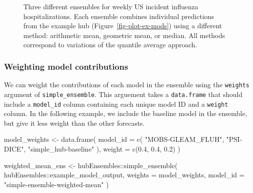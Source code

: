 \documentclass[
]{article}
\newenvironment{Shaded}{\begin{snugshade}}{\end{snugshade}}
\newcommand{\AttributeTok}[1]{\textcolor[rgb]{0.40,0.45,0.13}{#1}}
\newcommand{\FloatTok}[1]{\textcolor[rgb]{0.68,0.00,0.00}{#1}}
\newcommand{\FunctionTok}[1]{\textcolor[rgb]{0.28,0.35,0.67}{#1}}
\newcommand{\NormalTok}[1]{\textcolor[rgb]{0.00,0.23,0.31}{#1}}
\newcommand{\OtherTok}[1]{\textcolor[rgb]{0.00,0.23,0.31}{#1}}
\newcommand{\SpecialCharTok}[1]{\textcolor[rgb]{0.37,0.37,0.37}{#1}}
\newcommand{\StringTok}[1]{\textcolor[rgb]{0.13,0.47,0.30}{#1}}
\begin{document}
\begin{figure}[H]


\caption{\label{fig-plot-ensembles}Three different ensembles for weekly
US incident influenza hospitalizations. Each ensemble combines
individual predictions from the example hub
(Figure~\ref{fig-plot-ex-mods}) using a different method: arithmetic
mean, geometric mean, or median. All methods correspond to variations of
the quantile average approach.}

\end{figure}%

\subsubsection{Weighting model
contributions}\label{weighting-model-contributions}

We can weight the contributions of each model in the ensemble using the
\texttt{weights} argument of \texttt{simple\_ensemble}. This arguement
takes a \texttt{data.frame} that should include a \texttt{model\_id}
column containing each unique model ID and a \texttt{weight} column. In
the following example, we include the baseline model in the ensemble,
but give it less weight than the other forecasts.

\begin{Shaded}
\begin{Highlighting}[]
\NormalTok{model\_weights }\OtherTok{\textless{}{-}} \FunctionTok{data.frame}\NormalTok{(}
  \AttributeTok{model\_id =} \FunctionTok{c}\NormalTok{(}
    \StringTok{"MOBS{-}GLEAM\_FLUH"}\NormalTok{, }\StringTok{"PSI{-}DICE"}\NormalTok{,}
    \StringTok{"simple\_hub{-}baseline"}
\NormalTok{  ),}
  \AttributeTok{weight =} \FunctionTok{c}\NormalTok{(}\FloatTok{0.4}\NormalTok{, }\FloatTok{0.4}\NormalTok{, }\FloatTok{0.2}\NormalTok{)}
\NormalTok{)}

\NormalTok{weighted\_mean\_ens }\OtherTok{\textless{}{-}}
\NormalTok{  hubEnsembles}\SpecialCharTok{::}\FunctionTok{simple\_ensemble}\NormalTok{(}
\NormalTok{    hubEnsembles}\SpecialCharTok{::}\NormalTok{example\_model\_output,}
    \AttributeTok{weights =}\NormalTok{ model\_weights,}
    \AttributeTok{model\_id =} \StringTok{"simple{-}ensemble{-}weighted{-}mean"}
\NormalTok{  )}
\end{Highlighting}
\end{Shaded}
\end{document}
